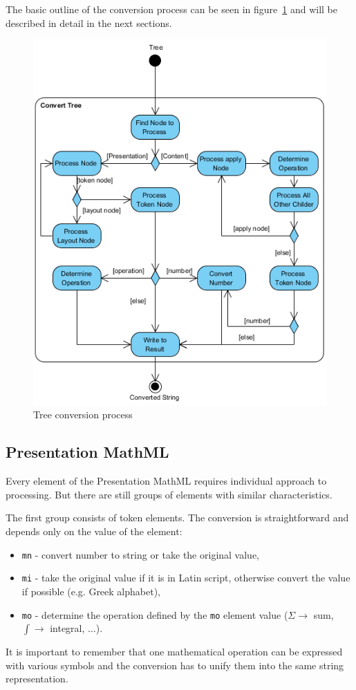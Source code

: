 \documentclass[11pt,oneside,final]{fithesis2}
\begin{document}
The basic outline of the conversion process can be seen in figure~\ref{fig:converttree} and will be described in detail in the next sections.

\begin{figure}[!ht]
\centering
\includegraphics{activity_diagram_tree}
\caption{Tree conversion process}
\label{fig:converttree}
\end{figure}

\subsection{Presentation MathML}
Every element of the Presentation MathML requires individual approach to processing. But there are still groups of elements with similar characteristics. 

The first group consists of token elements. The conversion is straightforward and depends only on the value of the element:
\begin{itemize}
\item \texttt{mn} - convert number to string or take the original value,
\item \texttt{mi} - take the original value if it is in Latin script, otherwise convert the value if possible (e.g. Greek alphabet),
\item \texttt{mo} - determine the operation defined by the \texttt{mo} element value ($\Sigma \rightarrow$ sum, $\int \rightarrow$ integral, $\ldots$).
\end{itemize}
It is important to remember that one mathematical operation can be expressed with various symbols and the conversion has to unify them into the same string representation.
\end{document}
